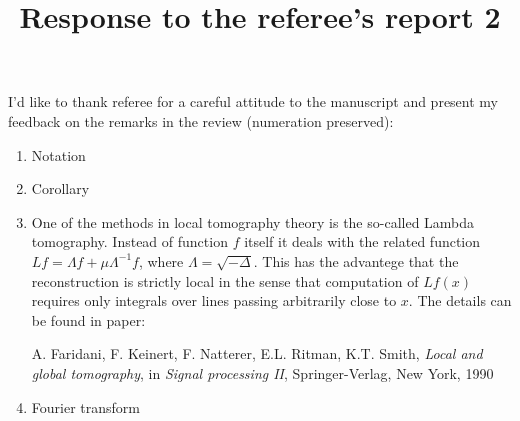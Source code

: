 \documentclass{article}
\title{Response to the referee's report 2}
\date{}
\begin{document}
\maketitle

I'd like to thank referee for a careful attitude to the manuscript and present my feedback on the remarks in the review (numeration preserved):

\begin{enumerate}
\item Notation
\item Corollary
\item One of the methods in local tomography theory is the so-called Lambda tomography. Instead of function $f$ itself it deals with the related function $Lf = \Lambda f+\mu\Lambda^{-1}f$, where $\Lambda = \sqrt{-\Delta}$. This has the advantege that the reconstruction is strictly local in the sense that computation of $Lf(x)$ requires only integrals over lines passing arbitrarily close to $x$. The details can be found in paper:

A. Faridani, F. Keinert, F. Natterer, E.L. Ritman, K.T. Smith, \textit{Local and global tomography}, in \textit{Signal processing II}, Springer-Verlag, New York, 1990 

{\color{red}{Check the publication}}
  
\item Fourier transform
\end{enumerate}
\end{document}
